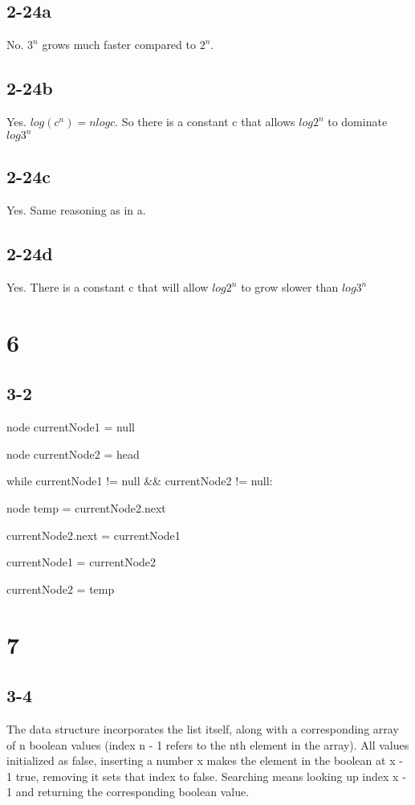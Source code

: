 \documentclass[16pt]{article}
\begin{document}
\subsection*{2-24a}
\noindent No. $3^{n}$ grows much faster compared to $2^{n}$.
\subsection*{2-24b}
\noindent Yes. $log(c^{n}) = nlogc$.  So there is a constant c that allows $log2^{n}$ to dominate $log3^{n}$
\subsection*{2-24c}
\noindent Yes.  Same reasoning as in a.
\subsection*{2-24d}
\noindent Yes.  There is a constant c that will allow $log2^{n}$ to grow slower than $log3^{n}$

\section*{6}
\subsection*{3-2}

\noindent node currentNode1 = null \par
\noindent node currentNode2 = head \par
\noindent while currentNode1 != null \&\& currentNode2 != null: \par
\hspace{5mm} node temp = currentNode2.next \par
\hspace{5mm} currentNode2.next = currentNode1 \par
\hspace{5mm} currentNode1 = currentNode2 \par
\hspace{5mm} currentNode2 = temp

\section*{7}
\subsection*{3-4}
\noindent The data structure incorporates the list itself, along with a corresponding array of n boolean values (index n - 1 refers to the nth element in the array).  All values initialized as false, inserting a number x makes the element in the boolean at x - 1 true, removing it sets that index to false.  Searching means looking up index x - 1 and returning the corresponding boolean value.
\end{document}

